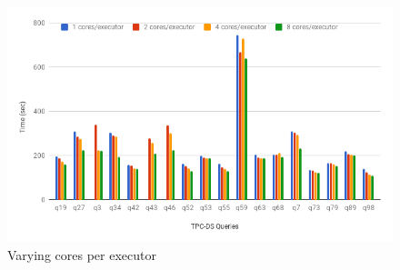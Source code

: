 \begin{figure}[h]
	\includegraphics[width=\linewidth]{fig/varycore.png}
	\caption{Varying cores per executor \protect\footnotemark[1]}
	\label{fig:varycore}
\end{figure}

